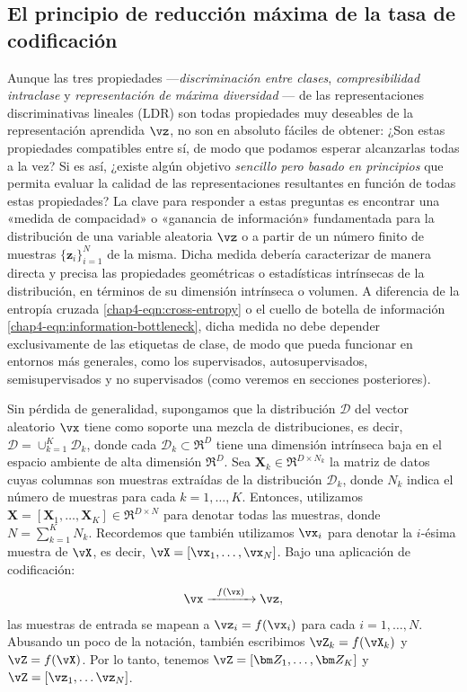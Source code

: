 \documentclass[../../book-main.tex]{subfiles}
\begin{document}
\subsection{El principio de reducción máxima de la tasa de 
codificación}\label{subsec:MCR2}

Aunque las tres propiedades ---{\em discriminación entre clases}, {\em
compresibilidad intraclase} y {\em representación de máxima diversidad
}--- de las representaciones discriminativas lineales (LDR)
son todas propiedades muy deseables de la representación aprendida
$\vz$, no son en absoluto fáciles de obtener: ¿Son estas propiedades
compatibles entre sí, de modo que podamos esperar alcanzarlas todas a la vez? Si es así,
¿existe algún objetivo {\em sencillo pero basado en principios} que permita evaluar la
calidad de las representaciones resultantes en función de todas estas
propiedades? La clave para responder a estas preguntas {es encontrar} una
«medida de compacidad» o «ganancia de información» fundamentada para la
distribución de una variable aleatoria $\vz$ o a partir de un número finito de muestras 
$\{\bm z_i\}_{i=1}^N$ de la misma. Dicha medida debería caracterizar de manera directa y precisa
las propiedades geométricas o estadísticas intrínsecas de la
distribución, en términos de su dimensión intrínseca o {volumen}. A diferencia
de la entropía cruzada \eqref{chap4-eqn:cross-entropy} o el cuello de botella de información
\eqref{chap4-eqn:information-bottleneck}, dicha medida
no debe depender exclusivamente de las etiquetas de clase, de modo que pueda funcionar en
entornos más generales, como los supervisados, autosupervisados,
semisupervisados y no supervisados (como veremos en
secciones posteriores).

Sin pérdida de generalidad, supongamos que la distribución $\mathcal D$
del vector aleatorio $\vx$ tiene como soporte una mezcla de distribuciones,
es decir, $\mathcal D = \cup_{k=1}^K \mathcal{D}_k$, donde cada
$\mathcal{D}_k \subset \Re^D$ tiene una dimensión intrínseca baja en el
espacio ambiente de alta dimensión $\Re^D$. Sea $\bm X_k \in \Re^{D\times
N_k}$ la matriz de datos cuyas columnas son muestras extraídas de la
distribución $\mathcal{D}_k$, donde $N_k$ indica el número de
muestras para cada $k=1,\dots,K$. Entonces, utilizamos $\bm X=[\bm
X_1,\dots,\bm X_K] \in \Re^{D\times N}$ para denotar todas las muestras,
donde $N=\sum_{k=1}^K N_k$. 
Recordemos que también utilizamos $\vx_i$ para denotar la $i$-ésima muestra de $\vX$,
es decir, $\vX=[\vx_1,\dots,\vx_N] $. Bajo una aplicación de codificación:
\begin{equation}
    \vx  \xrightarrow{\hspace{2mm} f(\vx)\hspace{2mm}} \vz,
\end{equation}
las muestras de entrada se mapean a $\vz_i = f(\vx_i)$ para cada
$i=1,\dots,N$. Abusando un poco de la notación, también escribimos $\vZ_k =
f(\vX_k)$ y $\vZ = f(\vX)$. Por lo tanto, tenemos $\vZ = [\bm
Z_1,\dots,\bm Z_K]$ y $\vZ = [\vz_1,\dots\vz_N]$.
\end{document}
